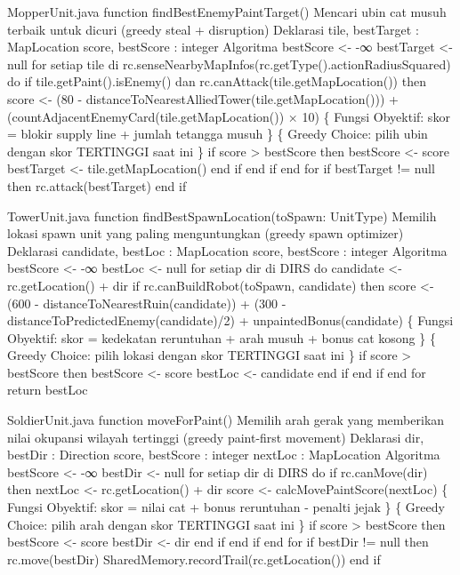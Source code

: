\begin{pseudocode}{MopperUnit.java}
function findBestEnemyPaintTarget()
{ Mencari ubin cat musuh terbaik untuk dicuri (greedy steal + disruption) }
{ Deklarasi }
tile, bestTarget : MapLocation
score, bestScore : integer
{ Algoritma }
bestScore <- -∞
bestTarget <- null
for setiap tile di rc.senseNearbyMapInfos(rc.getType().actionRadiusSquared) do
    if tile.getPaint().isEnemy() dan rc.canAttack(tile.getMapLocation()) then
        score <- (80 - distanceToNearestAlliedTower(tile.getMapLocation())) + (countAdjacentEnemyCard(tile.getMapLocation()) × 10)
        \{ Fungsi Obyektif: skor = blokir supply line + jumlah tetangga musuh \}
        \{ Greedy Choice: pilih ubin dengan skor TERTINGGI saat ini \}
        if score > bestScore then
            bestScore <- score
            bestTarget <- tile.getMapLocation()
        end if
    end if
end for
if bestTarget != null then
    rc.attack(bestTarget)
end if
\end{pseudocode}

\begin{pseudocode}{TowerUnit.java}
function findBestSpawnLocation(toSpawn: UnitType)
{ Memilih lokasi spawn unit yang paling menguntungkan (greedy spawn optimizer) }
{ Deklarasi }
candidate, bestLoc : MapLocation
score, bestScore : integer
{ Algoritma }
bestScore <- -∞
bestLoc <- null
for setiap dir di DIRS do
    candidate <- rc.getLocation() + dir
    if rc.canBuildRobot(toSpawn, candidate) then
        score <- (600 - distanceToNearestRuin(candidate)) + (300 - distanceToPredictedEnemy(candidate)/2) + unpaintedBonus(candidate)
        \{ Fungsi Obyektif: skor = kedekatan reruntuhan + arah musuh + bonus cat kosong \}
        \{ Greedy Choice: pilih lokasi dengan skor TERTINGGI saat ini \}
        if score > bestScore then
            bestScore <- score
            bestLoc <- candidate
        end if
    end if
end for
return bestLoc
\end{pseudocode}

\begin{pseudocode}{SoldierUnit.java}
function moveForPaint()
{ Memilih arah gerak yang memberikan nilai okupansi wilayah tertinggi (greedy paint-first movement) }
{ Deklarasi }
dir, bestDir : Direction
score, bestScore : integer
nextLoc : MapLocation
{ Algoritma }
bestScore <- -∞
bestDir <- null
for setiap dir di DIRS do
    if rc.canMove(dir) then
        nextLoc <- rc.getLocation() + dir
        score <- calcMovePaintScore(nextLoc)
        \{ Fungsi Obyektif: skor = nilai cat + bonus reruntuhan - penalti jejak \}
        \{ Greedy Choice: pilih arah dengan skor TERTINGGI saat ini \}
        if score > bestScore then
            bestScore <- score
            bestDir <- dir
        end if
    end if
end for
if bestDir != null then
    rc.move(bestDir)
    SharedMemory.recordTrail(rc.getLocation())
end if
\end{pseudocode}

